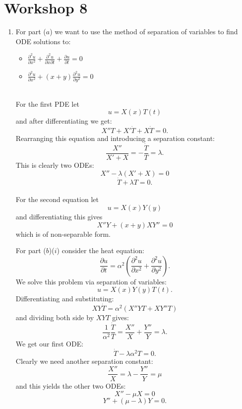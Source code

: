 \pagestyle{fancy}
\fancyhead{}

\section{Workshop 8}
\begin{enumerate}
    \item For part ($a$) we want to use the method of separation of variables
    to find ODE solutions to:
    \begin{itemize}
        \item $\displaystyle{\frac{\partial^2 u}{\partial x^2}
        +\frac{\partial^2 u}{\partial x\partial t}+\frac{\partial u}{\partial t}=0}$

        \item $\displaystyle{\frac{\partial^2 u}{\partial x^2}
        +(x+y)\frac{\partial^2 u}{\partial y^2}=0}$
    \end{itemize}
    \hspace{0.1in} \\
    
    For the first PDE let
    $$u=X(x)T(t)$$
    and after differentiating we get:
    $$X''T+X'\dot{T}+X\dot{T}=0.$$
    Rearranging this equation and introducing a separation constant:
    $$\frac{X''}{X'+X}=-\frac{\dot{T}}{T}=\lambda.$$
    This is clearly two ODEs:
    $$X''-\lambda(X'+X)=0$$
    $$\dot{T}+\lambda T=0.$$ \\
    
    For the second equation let
    $$u=X(x)Y(y)$$
    and differentiating this gives
    $$X''Y+(x+y)XY''=0$$
    which is of non-separable form.

    \newpage

    For part ($b$)($i$) consider the heat equation:
    $$\frac{\partial u}{\partial t}=\alpha^2
    \left(\frac{\partial^2 u}{\partial x^2}+\frac{\partial^2 u}{\partial y^2}\right).$$
    We solve this problem via separation of variables:
    $$u=X(x)Y(y)T(t).$$
    Differentiating and substituting:
    $$XY\dot{T}=\alpha^2\left(X''YT+XY''T\right)$$
    and dividing both side by $XYT$ gives:
    $$\frac{1}{\alpha^2}\frac{\dot{T}}{T}
    =\frac{X''}{X}+\frac{Y''}{Y}=\lambda.$$
    We get our first ODE:
    $$\dot{T}-\lambda\alpha^2 T=0.$$
    Clearly we need another separation constant:
    $$\frac{X''}{X}=\lambda-\frac{Y''}{Y}=\mu$$
    and this yields the other two ODEs:
    $$X''-\mu X=0$$
    $$Y''+(\mu-\lambda)Y=0.$$


\end{enumerate}
